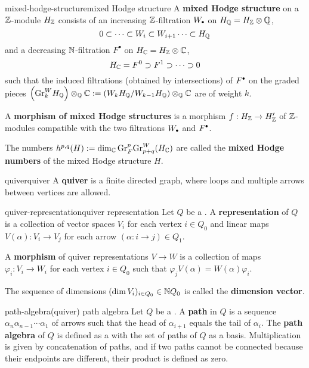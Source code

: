\begin{topic}{mixed-hodge-structure}{mixed Hodge structure}
    A \textbf{mixed Hodge structure} on a $\mathbb{Z}$-module $H_{\mathbb{Z}}$ consists of an increasing $\mathbb{Z}$-filtration $W_\bdot$ on $H_{\mathbb{Q}} = H_{\mathbb{Z}} \otimes \mathbb{Q}$,
    \[ 0 \subset \cdots \subset W_i \subset W_{i + 1} \cdots \subset H_{\mathbb{Q}} \]
    and a decreasing $\mathbb{N}$-filtration $F^\bullet$ on $H_{\mathbb{C}} = H_{\mathbb{Z}} \otimes \mathbb{C}$,
    \[ H_{\mathbb{C}} = F^0 \supset F^1 \supset \cdots \supset 0 \]
    such that the induced filtrations (obtained by intersections) of $F^\bdot$ on the graded pieces $\left(\text{Gr}^W_k H_{\mathbb{Q}}\right) \otimes_{\mathbb{Q}} \mathbb{C} := \left(W_k H_{\mathbb{Q}} / W_{k - 1} H_{\mathbb{Q}}\right) \otimes_{\mathbb{Q}} \mathbb{C}$ are  of weight $k$.
    
    A \textbf{morphism of mixed Hodge structures} is a morphism $f : H_{\mathbb{Z}} \to H'_{\mathbb{Z}}$ of $\mathbb{Z}$-modules compatible with the two filtrations $W_\bdot$ and $F^\bdot$.
    
    The numbers $h^{p, q}(H) := \dim_{\mathbb{C}} \textup{Gr}_F^p \textup{Gr}^W_{p + q}(H_{\mathbb{C}})$ are called the \textbf{mixed Hodge numbers} of the mixed Hodge structure $H$.
\end{topic}

\begin{topic}{quiver}{quiver}
    A \textbf{quiver} is a finite directed graph, where loops and multiple arrows between vertices are allowed.    
\end{topic}

\begin{topic}{quiver-representation}{quiver representation}
    Let $Q$ be a . A \textbf{representation} of $Q$ is a collection of vector spaces $V_i$ for each vertex $i \in Q_0$ and linear maps $V(\alpha) : V_i \to V_j$ for each arrow $(\alpha : i \to j) \in Q_1$.
    
    A \textbf{morphism} of quiver representations $V \to W$ is a collection of maps $\varphi_i : V_i \to W_i$ for each vertex $i \in Q_0$ such that $\varphi_j V(\alpha) = W(\alpha) \varphi_i$.
    
    The sequence of dimensions $(\dim V_i)_{i \in Q_0} \in \mathbb{N} Q_0$ is called the \textbf{dimension vector}.
\end{topic}

\begin{topic}{path-algebra}{(quiver) path algebra}
    Let $Q$ be a . A \textbf{path} in $Q$ is a sequence $\alpha_n \alpha_{n - 1} \cdots \alpha_1$ of arrows such that the head of $\alpha_{i + 1}$ equals the tail of $\alpha_{i}$. The \textbf{path algebra} of $Q$ is defined as a  with the set of paths of $Q$ as a basis. Multiplication is given by concatenation of paths, and if two paths cannot be connected because their endpoints are different, their product is defined as zero.
\end{topic}

